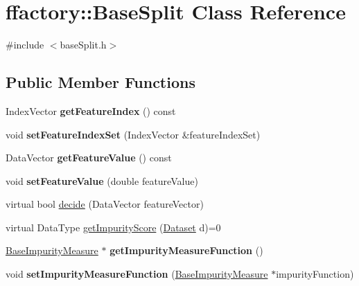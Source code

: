 \hypertarget{classffactory_1_1_base_split}{\section{ffactory\-:\-:Base\-Split Class Reference}
\label{classffactory_1_1_base_split}
}


{\ttfamily \#include $<$base\-Split.\-h$>$}

\subsection*{Public Member Functions}
\begin{DoxyCompactItemize}
\item 
\hypertarget{classffactory_1_1_base_split_a0d58b369b12890e76ea0548c9fdab217}{Index\-Vector {\bfseries get\-Feature\-Index} () const }\label{classffactory_1_1_base_split_a0d58b369b12890e76ea0548c9fdab217}

\item 
\hypertarget{classffactory_1_1_base_split_a078ac711bddfb871e5473a1fa3da124f}{void {\bfseries set\-Feature\-Index\-Set} (Index\-Vector \&feature\-Index\-Set)}\label{classffactory_1_1_base_split_a078ac711bddfb871e5473a1fa3da124f}

\item 
\hypertarget{classffactory_1_1_base_split_abbccdac7fa366b151326b730aa6ccf38}{Data\-Vector {\bfseries get\-Feature\-Value} () const }\label{classffactory_1_1_base_split_abbccdac7fa366b151326b730aa6ccf38}

\item 
\hypertarget{classffactory_1_1_base_split_adaa4d2651f77b5946b487cac0d45c4cb}{void {\bfseries set\-Feature\-Value} (double feature\-Value)}\label{classffactory_1_1_base_split_adaa4d2651f77b5946b487cac0d45c4cb}

\item 
virtual bool \hyperlink{classffactory_1_1_base_split_a86e2a328692f90e3993b117ce17bf452}{decide} (Data\-Vector feature\-Vector)
\item 
virtual Data\-Type \hyperlink{classffactory_1_1_base_split_ae2195df1e6a0f7774e12c65a89975f4c}{get\-Impurity\-Score} (\hyperlink{classffactory_1_1_dataset}{Dataset} d)=0
\item 
\hypertarget{classffactory_1_1_base_split_a7151988e8ff47ef87890da1b08f9008b}{\hyperlink{classffactory_1_1_base_impurity_measure}{Base\-Impurity\-Measure} $\ast$ {\bfseries get\-Impurity\-Measure\-Function} ()}\label{classffactory_1_1_base_split_a7151988e8ff47ef87890da1b08f9008b}

\item 
\hypertarget{classffactory_1_1_base_split_a3edcedf23d144f69e04693f7a5fd8de8}{void {\bfseries set\-Impurity\-Measure\-Function} (\hyperlink{classffactory_1_1_base_impurity_measure}{Base\-Impurity\-Measure} $\ast$impurity\-Function)}\label{classffactory_1_1_base_split_a3edcedf23d144f69e04693f7a5fd8de8}

\end{DoxyCompactItemize}


